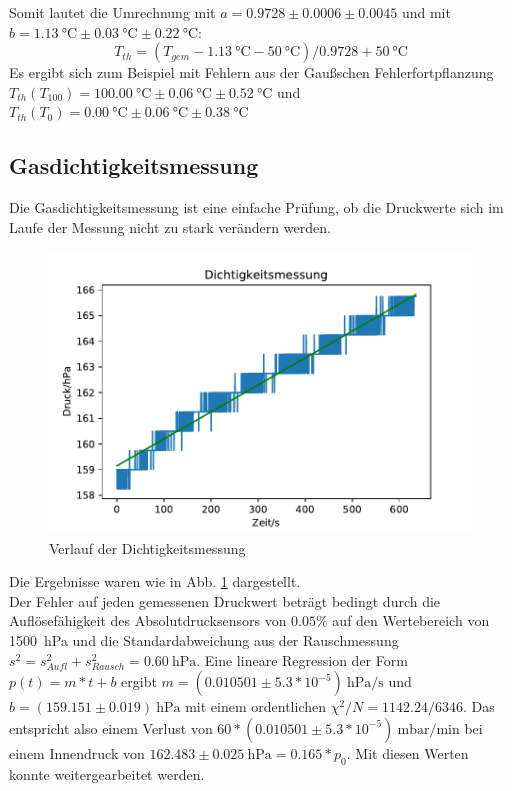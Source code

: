 \documentclass[]{article}
\begin{document}
Somit lautet die Umrechnung
mit $a = 0.9728 \pm 0.0006 \pm 0.0045$
und mit $b = \SI{1.13}{\celsius} \pm \SI{0.03}{\celsius} \pm \SI{0.22}{\celsius}$:
\begin{equation}
T_{th} = (T_{gem}-\SI{1.13}{\celsius}-\SI{50}{\celsius})/0.9728 + \SI{50}{\celsius}
\label{Kalibrierung}
\end{equation}
Es ergibt sich zum Beispiel mit Fehlern aus der Gaußschen Fehlerfortpflanzung $T_{th}(T_{100}) = \SI{100.00}{\celsius} \pm  \SI{0.06}{\celsius} \pm \SI{0.52}{\celsius}$
und $T_{th}(T_0) = \SI{0.00}{\celsius} \pm \SI{0.06}{\celsius} \pm \SI{0.38}{\celsius}$
\\
\subsection{Gasdichtigkeitsmessung}
Die Gasdichtigkeitsmessung ist eine einfache Prüfung, ob die Druckwerte sich im Laufe der Messung nicht zu stark verändern werden.\\
\begin{figure}
	\begin{center}
		\includegraphics[scale=0.9]{Images/Kalib_Dichtigkeitsmessung.pdf}
		\caption{Verlauf der Dichtigkeitsmessung}
		\label{GD_data}
	\end{center}
\end{figure}
Die Ergebnisse waren wie in Abb. \ref{GD_data} dargestellt. \\
Der Fehler auf jeden gemessenen Druckwert beträgt bedingt durch die Auflösefähigkeit des Absolutdrucksensors von $0.05\%$ auf den Wertebereich von \SI{1500}{\hecto \pascal} und die
 Standardabweichung aus der Rauschmessung $s^{2} = s^{2}_{Aufl}+s^{2}_{Rausch} = \SI{0.60}{\hecto \pascal}$. 
Eine lineare Regression der Form $p(t)=m*t+b$ ergibt $m = (0.010501 \pm 5.3*10^{-5})\SI{}{\hecto \pascal/ \second}$ und $b = (159.151 \pm 0.019)\SI{}{\hecto \pascal}$ mit einem ordentlichen $\chi ^{2}/N=1142.24 / 6346$. Das entspricht also einem Verlust von $60*(0.010501 \pm 5.3*10^{-5})\SI{}{\milli \bar / \minute}$ bei einem Innendruck von $162.483 \pm 0.025 \SI{}{\hecto \pascal} = 0.165*p_0$. Mit diesen Werten konnte weitergearbeitet werden.
\end{document}
